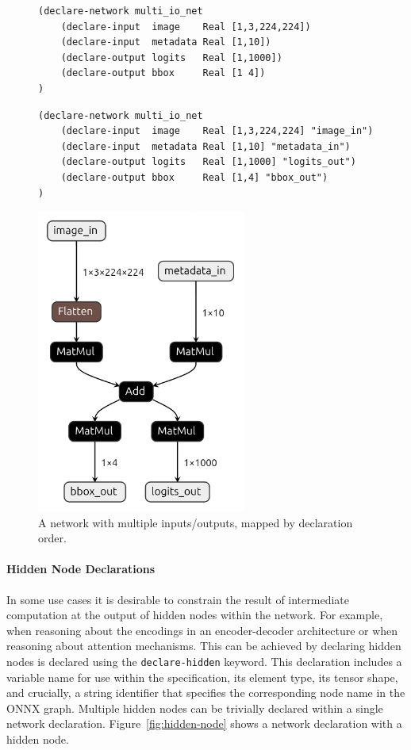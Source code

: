 \begin{figure}[h!]
    \centering
    \begin{lstlisting}[style=lbnf]
(declare-network multi_io_net
    (declare-input  image    Real [1,3,224,224])
    (declare-input  metadata Real [1,10])
    (declare-output logits   Real [1,1000])
    (declare-output bbox     Real [1 4])
)\end{lstlisting}

    \begin{lstlisting}[style=lbnf]
(declare-network multi_io_net
    (declare-input  image    Real [1,3,224,224] "image_in")
    (declare-input  metadata Real [1,10] "metadata_in")
    (declare-output logits   Real [1,1000] "logits_out")
    (declare-output bbox     Real [1,4] "bbox_out")
)\end{lstlisting}

    \vspace{0.5cm}
    \includegraphics[height=10cm]{imgs/multi_io_net.onnx.png}
    \caption{A network with multiple inputs/outputs, mapped by declaration order.}
    \label{fig:multi-inputs-outputs}
\end{figure}


\paragraph{Hidden Node Declarations}
\label{sec:hidden-node-declarations}

In some use cases it is desirable to constrain the result of intermediate computation at the output of hidden nodes within the network. For example, when reasoning about the encodings in an encoder-decoder architecture or when reasoning about attention mechanisms.
This can be achieved by declaring hidden nodes is declared using the \texttt{declare-hidden} keyword. This declaration includes a variable name for use within the \vnnlib{} specification, 
its element type, its tensor shape, and crucially, a string identifier that specifies the corresponding node name in the ONNX graph.  Multiple
hidden nodes can be trivially declared within a single network declaration. Figure~\ref{fig:hidden-node} shows a \vnnlib{} network declaration with a hidden node.

